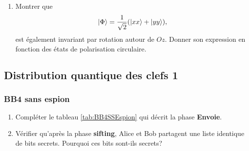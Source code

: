 \begin{enumerate}
\begin{enumerate}
\end{enumerate}

\item Montrer que
\begin{equation}
\vert\Phi\rangle=\frac{1}{\sqrt{2}}(\vert xx\rangle+\vert yy\rangle),
\end{equation}
est également invariant par rotation autour de $Oz$. Donner son expression en
fonction des états de polarisation circulaire.
\end{enumerate}


\subsection{Distribution quantique des clefs 1}

\subsubsection{BB4 sans espion}

\begin{enumerate}
\item Compléter le tableau \ref{tab:BB4SSEspion} qui décrit la phase
\textbf{Envoie}.

\item Vérifier qu'après la phase \textbf{sifting}, Alice et Bob partagent une
liste identique de bits secrets. Pourquoi ces bits sont-ils secrets?
\end{enumerate}

